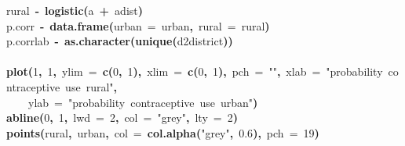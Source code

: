 \documentclass{article}
\makeatletter
\newcommand{\hlnumber}[1]{\textcolor[rgb]{0,0,0}{#1}}%
\newcommand{\hlfunctioncall}[1]{\textcolor[rgb]{.5,0,.33}{\textbf{#1}}}%
\newcommand{\hlstring}[1]{\textcolor[rgb]{.6,.6,1}{#1}}%
\newcommand{\hlkeyword}[1]{\textbf{#1}}%
\newcommand{\hlargument}[1]{\textcolor[rgb]{.69,.25,.02}{#1}}%
\newcommand{\hlassignement}[1]{\textbf{#1}}%
\newcommand{\hlsymbol}[1]{#1}%
\newcommand{\hlstd}[1]{\textcolor[rgb]{0,0,0}{#1}}%
\newenvironment{kframe}{%
 \def\FrameCommand##1{\hskip\@totalleftmargin \hskip-\fboxsep
 \colorbox{shadecolor}{##1}\hskip-\fboxsep
     \hskip-\linewidth \hskip-\@totalleftmargin \hskip\columnwidth}%
 \MakeFramed {\advance\hsize-\width
   \@totalleftmargin\z@ \linewidth\hsize
   \@setminipage}}%
 {\par\unskip\endMakeFramed}
\newenvironment{knitrout}{}{} %
\makeatother
\begin{document}
\begin{knitrout}
{\begin{kframe}
\begin{flushleft}
\hlstd{}\hlsymbol{rural}{\ }\hlassignement{\usebox{\hlnormalsizeboxlessthan}-}{\ }\hlfunctioncall{logistic}\hlkeyword{(}\hlsymbol{a}{\ }\hlkeyword{+}{\ }\hlsymbol{a\usebox{\hlnormalsizeboxunderscore}dist}\hlkeyword{)}\hspace*{\fill}\\
\hlstd{}\hlsymbol{p.corr}{\ }\hlassignement{\usebox{\hlnormalsizeboxlessthan}-}{\ }\hlfunctioncall{data.frame}\hlkeyword{(}\hlargument{urban}{\ }\hlargument{=}{\ }\hlsymbol{urban}\hlkeyword{,}{\ }\hlargument{rural}{\ }\hlargument{=}{\ }\hlsymbol{rural}\hlkeyword{)}\hspace*{\fill}\\
\hlstd{}\hlsymbol{p.corr}\hlkeyword{\usebox{\hlnormalsizeboxdollar}}\hlsymbol{lab}{\ }\hlassignement{\usebox{\hlnormalsizeboxlessthan}-}{\ }\hlfunctioncall{as.character}\hlkeyword{(}\hlfunctioncall{unique}\hlkeyword{(}\hlsymbol{d2}\hlkeyword{\usebox{\hlnormalsizeboxdollar}}\hlsymbol{district}\hlkeyword{)}\hlkeyword{)}\hspace*{\fill}\\
\hlstd{}\hspace*{\fill}\\
\hlstd{}\hlfunctioncall{plot}\hlkeyword{(}\hlnumber{1}\hlkeyword{,}{\ }\hlnumber{1}\hlkeyword{,}{\ }\hlargument{ylim}{\ }\hlargument{=}{\ }\hlfunctioncall{c}\hlkeyword{(}\hlnumber{0}\hlkeyword{,}{\ }\hlnumber{1}\hlkeyword{)}\hlkeyword{,}{\ }\hlargument{xlim}{\ }\hlargument{=}{\ }\hlfunctioncall{c}\hlkeyword{(}\hlnumber{0}\hlkeyword{,}{\ }\hlnumber{1}\hlkeyword{)}\hlkeyword{,}{\ }\hlargument{pch}{\ }\hlargument{=}{\ }\hlstring{"{}"{}}\hlkeyword{,}{\ }\hlargument{xlab}{\ }\hlargument{=}{\ }\hlstring{"{}probability{\ }contraceptive{\ }use{\ }rural"{}}\hlkeyword{,}\hspace*{\fill}\\
\hlstd{}{\ }{\ }{\ }{\ }\hlargument{ylab}{\ }\hlargument{=}{\ }\hlstring{"{}probability{\ }contraceptive{\ }use{\ }urban"{}}\hlkeyword{)}\hspace*{\fill}\\
\hlstd{}\hlfunctioncall{abline}\hlkeyword{(}\hlnumber{0}\hlkeyword{,}{\ }\hlnumber{1}\hlkeyword{,}{\ }\hlargument{lwd}{\ }\hlargument{=}{\ }\hlnumber{2}\hlkeyword{,}{\ }\hlargument{col}{\ }\hlargument{=}{\ }\hlstring{"{}grey"{}}\hlkeyword{,}{\ }\hlargument{lty}{\ }\hlargument{=}{\ }\hlnumber{2}\hlkeyword{)}\hspace*{\fill}\\
\hlstd{}\hlfunctioncall{points}\hlkeyword{(}\hlsymbol{rural}\hlkeyword{,}{\ }\hlsymbol{urban}\hlkeyword{,}{\ }\hlargument{col}{\ }\hlargument{=}{\ }\hlfunctioncall{col.alpha}\hlkeyword{(}\hlstring{"{}grey"{}}\hlkeyword{,}{\ }\hlnumber{0.6}\hlkeyword{)}\hlkeyword{,}{\ }\hlargument{pch}{\ }\hlargument{=}{\ }\hlnumber{19}\hlkeyword{)}\hspace*{\fill}\\

\end{flushleft}
\end{kframe}}
\end{knitrout}
\end{document}
